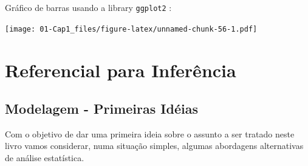 \documentclass[]{book}
\newenvironment{Shaded}{\begin{snugshade}}{\end{snugshade}}
\newcommand{\KeywordTok}[1]{\textcolor[rgb]{0.13,0.29,0.53}{\textbf{#1}}}
\newcommand{\DataTypeTok}[1]{\textcolor[rgb]{0.13,0.29,0.53}{#1}}
\newcommand{\DecValTok}[1]{\textcolor[rgb]{0.00,0.00,0.81}{#1}}
\newcommand{\StringTok}[1]{\textcolor[rgb]{0.31,0.60,0.02}{#1}}
\newcommand{\OperatorTok}[1]{\textcolor[rgb]{0.81,0.36,0.00}{\textbf{#1}}}
\newcommand{\NormalTok}[1]{#1}
\theoremstyle{definition}
\theoremstyle{definition}
\theoremstyle{definition}
\theoremstyle{remark}
\begin{document}
Gráfico de barras usando a library \texttt{ggplot2} \citep{R-ggplot2}:

\begin{Shaded}
\end{Shaded}

\texttt{[image: 01-Cap1\_files/figure-latex/unnamed-chunk-56-1.pdf]}

\chapter{Referencial para Inferência}\label{refinf}

\section{Modelagem - Primeiras Idéias}\label{classic}

Com o objetivo de dar uma primeira ideia sobre o assunto a ser tratado
neste livro vamos considerar, numa situação simples, algumas abordagens
alternativas de análise estatística.
\end{document}
